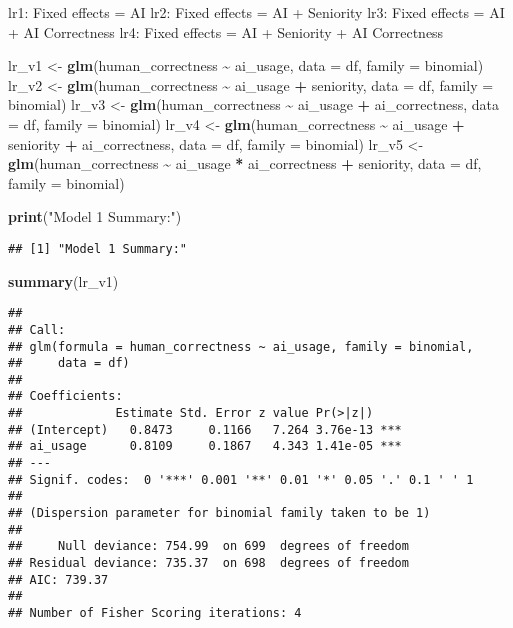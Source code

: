 \documentclass[
]{article}
\newenvironment{Shaded}{\begin{snugshade}}{\end{snugshade}}
\newcommand{\AttributeTok}[1]{\textcolor[rgb]{0.13,0.29,0.53}{#1}}
\newcommand{\FunctionTok}[1]{\textcolor[rgb]{0.13,0.29,0.53}{\textbf{#1}}}
\newcommand{\NormalTok}[1]{#1}
\newcommand{\OtherTok}[1]{\textcolor[rgb]{0.56,0.35,0.01}{#1}}
\newcommand{\SpecialCharTok}[1]{\textcolor[rgb]{0.81,0.36,0.00}{\textbf{#1}}}
\newcommand{\StringTok}[1]{\textcolor[rgb]{0.31,0.60,0.02}{#1}}
\begin{document}
lr1: Fixed effects = AI lr2: Fixed effects = AI + Seniority lr3: Fixed
effects = AI + AI Correctness lr4: Fixed effects = AI + Seniority + AI
Correctness

\begin{Shaded}
\begin{Highlighting}[]
\NormalTok{lr\_v1 }\OtherTok{\textless{}{-}} \FunctionTok{glm}\NormalTok{(human\_correctness }\SpecialCharTok{\textasciitilde{}}\NormalTok{ ai\_usage, }\AttributeTok{data =}\NormalTok{ df, }\AttributeTok{family =}\NormalTok{ binomial)}
\NormalTok{lr\_v2 }\OtherTok{\textless{}{-}} \FunctionTok{glm}\NormalTok{(human\_correctness }\SpecialCharTok{\textasciitilde{}}\NormalTok{ ai\_usage }\SpecialCharTok{+}\NormalTok{ seniority, }\AttributeTok{data =}\NormalTok{ df, }\AttributeTok{family =}\NormalTok{ binomial)}
\NormalTok{lr\_v3 }\OtherTok{\textless{}{-}} \FunctionTok{glm}\NormalTok{(human\_correctness }\SpecialCharTok{\textasciitilde{}}\NormalTok{ ai\_usage }\SpecialCharTok{+}\NormalTok{ ai\_correctness, }\AttributeTok{data =}\NormalTok{ df, }\AttributeTok{family =}\NormalTok{ binomial)}
\NormalTok{lr\_v4 }\OtherTok{\textless{}{-}} \FunctionTok{glm}\NormalTok{(human\_correctness }\SpecialCharTok{\textasciitilde{}}\NormalTok{ ai\_usage }\SpecialCharTok{+}\NormalTok{ seniority }\SpecialCharTok{+}\NormalTok{ ai\_correctness, }\AttributeTok{data =}\NormalTok{ df, }\AttributeTok{family =}\NormalTok{ binomial)}
\NormalTok{lr\_v5 }\OtherTok{\textless{}{-}} \FunctionTok{glm}\NormalTok{(human\_correctness }\SpecialCharTok{\textasciitilde{}}\NormalTok{ ai\_usage }\SpecialCharTok{*}\NormalTok{ ai\_correctness }\SpecialCharTok{+}\NormalTok{ seniority, }\AttributeTok{data =}\NormalTok{ df, }\AttributeTok{family =}\NormalTok{ binomial)}

\FunctionTok{print}\NormalTok{(}\StringTok{"Model 1 Summary:"}\NormalTok{)}
\end{Highlighting}
\end{Shaded}

\begin{verbatim}
## [1] "Model 1 Summary:"
\end{verbatim}

\begin{Shaded}
\begin{Highlighting}[]
\FunctionTok{summary}\NormalTok{(lr\_v1)}
\end{Highlighting}
\end{Shaded}

\begin{verbatim}
## 
## Call:
## glm(formula = human_correctness ~ ai_usage, family = binomial, 
##     data = df)
## 
## Coefficients:
##             Estimate Std. Error z value Pr(>|z|)    
## (Intercept)   0.8473     0.1166   7.264 3.76e-13 ***
## ai_usage      0.8109     0.1867   4.343 1.41e-05 ***
## ---
## Signif. codes:  0 '***' 0.001 '**' 0.01 '*' 0.05 '.' 0.1 ' ' 1
## 
## (Dispersion parameter for binomial family taken to be 1)
## 
##     Null deviance: 754.99  on 699  degrees of freedom
## Residual deviance: 735.37  on 698  degrees of freedom
## AIC: 739.37
## 
## Number of Fisher Scoring iterations: 4
\end{verbatim}
\end{document}
